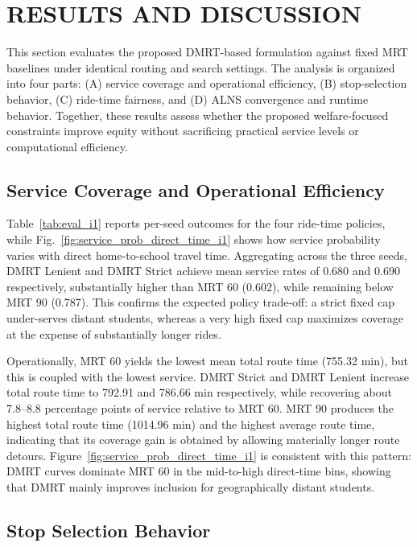 \documentclass[journal]{IEEEtran}
\begin{document}
\section{RESULTS AND DISCUSSION}

This section evaluates the proposed DMRT-based formulation against
fixed MRT baselines under identical routing and search settings.
The analysis is organized into four parts: (A) service coverage and
operational efficiency, (B) stop-selection behavior,
(C) ride-time fairness, and (D) ALNS convergence and runtime behavior.
Together, these results
assess whether the proposed welfare-focused constraints improve equity
without sacrificing practical service levels or computational efficiency.

\subsection{Service Coverage and Operational Efficiency}

Table~\ref{tab:eval_i1} reports per-seed outcomes for the four
ride-time policies, while
Fig.~\ref{fig:service_prob_direct_time_i1} shows how service
probability varies with direct home-to-school travel time.
Aggregating across the three seeds, DMRT Lenient and DMRT Strict
achieve mean service rates of 0.680 and 0.690 respectively,
substantially higher than MRT 60 (0.602), while remaining below
MRT 90 (0.787). This confirms the expected policy trade-off:
a strict fixed cap under-serves distant students, whereas a very
high fixed cap maximizes coverage at the expense of substantially
longer rides.

Operationally, MRT 60 yields the lowest mean total route time
(755.32 min), but this is coupled with the lowest service. DMRT
Strict and DMRT Lenient increase total route time to 792.91 and
786.66 min respectively, while recovering about 7.8--8.8 percentage
points of service relative to MRT 60. MRT 90 produces the highest
total route time (1014.96 min) and the highest average route time,
indicating that its coverage gain is obtained by allowing materially
longer route detours. Figure~\ref{fig:service_prob_direct_time_i1}
is consistent with this pattern: DMRT curves dominate MRT 60 in the
mid-to-high direct-time bins, showing that DMRT mainly improves
inclusion for geographically distant students.

\subsection{Stop Selection Behavior}
\end{document}
